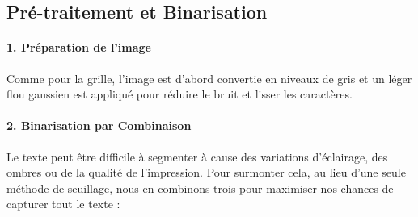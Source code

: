 \documentclass{article}
\begin{document}
\subsection{Pré-traitement et Binarisation}
\paragraph{1. Préparation de l'image}
Comme pour la grille, l'image est d'abord convertie en niveaux de gris et un léger flou gaussien est appliqué pour réduire le bruit et lisser les caractères.

\paragraph{2. Binarisation par Combinaison}
Le texte peut être difficile à segmenter à cause des variations d'éclairage, des ombres ou de la qualité de l'impression. Pour surmonter cela, au lieu d'une seule méthode de seuillage, nous en combinons trois pour maximiser nos chances de capturer tout le texte :
\end{document}

